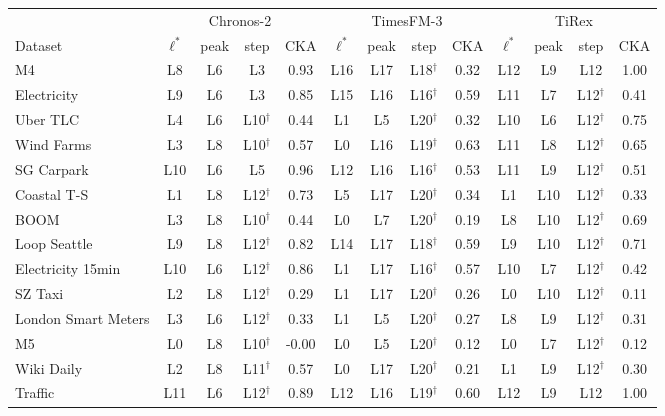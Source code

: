 \begin{tabular}{l cccc cccc cccc}
\toprule
 & \multicolumn{4}{c}{Chronos-2} & \multicolumn{4}{c}{TimesFM-3} & \multicolumn{4}{c}{TiRex} \\
\cmidrule(lr){2-5}\cmidrule(lr){6-9}\cmidrule(lr){10-13}
Dataset & $\ell^\ast$ & peak & step & CKA & $\ell^\ast$ & peak & step & CKA & $\ell^\ast$ & peak & step & CKA \\
\midrule
M4 & L8 & L6 & L3 & 0.93 & L16 & L17 & L18$^\dagger$ & 0.32 & L12 & L9 & L12 & 1.00 \\
Electricity & L9 & L6 & L3 & 0.85 & L15 & L16 & L16$^\dagger$ & 0.59 & L11 & L7 & L12$^\dagger$ & 0.41 \\
Uber TLC & L4 & L6 & L10$^\dagger$ & 0.44 & L1 & L5 & L20$^\dagger$ & 0.32 & L10 & L6 & L12$^\dagger$ & 0.75 \\
Wind Farms & L3 & L8 & L10$^\dagger$ & 0.57 & L0 & L16 & L19$^\dagger$ & 0.63 & L11 & L8 & L12$^\dagger$ & 0.65 \\
SG Carpark & L10 & L6 & L5 & 0.96 & L12 & L16 & L16$^\dagger$ & 0.53 & L11 & L9 & L12$^\dagger$ & 0.51 \\
Coastal T-S & L1 & L8 & L12$^\dagger$ & 0.73 & L5 & L17 & L20$^\dagger$ & 0.34 & L1 & L10 & L12$^\dagger$ & 0.33 \\
BOOM & L3 & L8 & L10$^\dagger$ & 0.44 & L0 & L7 & L20$^\dagger$ & 0.19 & L8 & L10 & L12$^\dagger$ & 0.69 \\
Loop Seattle & L9 & L8 & L12$^\dagger$ & 0.82 & L14 & L17 & L18$^\dagger$ & 0.59 & L9 & L10 & L12$^\dagger$ & 0.71 \\
Electricity 15min & L10 & L6 & L12$^\dagger$ & 0.86 & L1 & L17 & L16$^\dagger$ & 0.57 & L10 & L7 & L12$^\dagger$ & 0.42 \\
SZ Taxi & L2 & L8 & L12$^\dagger$ & 0.29 & L1 & L17 & L20$^\dagger$ & 0.26 & L0 & L10 & L12$^\dagger$ & 0.11 \\
London Smart Meters & L3 & L6 & L12$^\dagger$ & 0.33 & L1 & L5 & L20$^\dagger$ & 0.27 & L8 & L9 & L12$^\dagger$ & 0.31 \\
M5 & L0 & L8 & L10$^\dagger$ & -0.00 & L0 & L5 & L20$^\dagger$ & 0.12 & L0 & L7 & L12$^\dagger$ & 0.12 \\
Wiki Daily & L2 & L8 & L11$^\dagger$ & 0.57 & L0 & L17 & L20$^\dagger$ & 0.21 & L1 & L9 & L12$^\dagger$ & 0.30 \\
Traffic & L11 & L6 & L12$^\dagger$ & 0.89 & L12 & L16 & L19$^\dagger$ & 0.60 & L12 & L9 & L12 & 1.00 \\
\bottomrule
\end{tabular}
